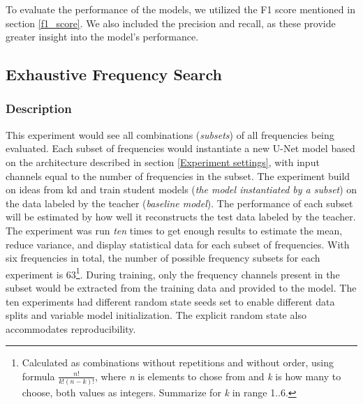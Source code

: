         To evaluate the performance of the models, we utilized the F1 score mentioned in section \ref{f1_score}. We also included the precision and recall, as these provide greater insight into the model's performance.
        
    
    \subsection{Exhaustive Frequency Search}
        \subsubsection{Description}
        This experiment would see all combinations (\textit{subsets}) of all frequencies being evaluated. Each subset of frequencies would instantiate a new U-Net model based on the architecture described in section \ref{Experiment settings}, with input channels equal to the number of frequencies in the subset. The experiment build on ideas from \gls{kd} and train student models (\textit{the model instantiated by a subset}) on the data labeled by the teacher (\textit{baseline model}). The performance of each subset will be estimated by how well it reconstructs the test data labeled by the teacher. The experiment was run \textit{ten} times to get enough results to estimate the mean, reduce variance, and display statistical data for each subset of frequencies. With six frequencies in total, the number of possible frequency subsets for each experiment is 63\footnote{Calculated as combinations without repetitions and without order, using formula $\frac{n!}{k!(n-k)!}$, where \textit{n} is elements to chose from and \textit{k} is how many to choose, both values as integers. Summarize for \textit{k} in range 1..6.}.  During training, only the frequency channels present in the subset would be extracted from the training data and provided to the model. The ten experiments had different random state seeds set to enable different data splits and variable model initialization. The explicit random state also accommodates reproducibility. 
        
